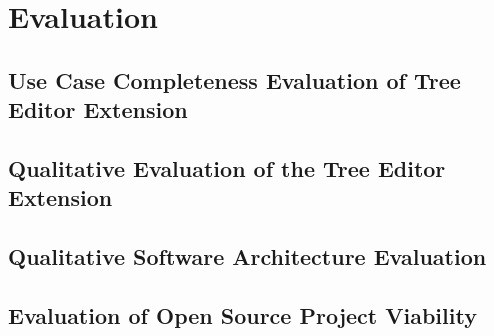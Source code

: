 \chapter{Evaluation}\label{chap:evaluation}

\section{Use Case Completeness Evaluation of Tree Editor Extension}




\section{Qualitative Evaluation of the Tree Editor Extension}




\section{Qualitative Software Architecture Evaluation}




\section{Evaluation of Open Source Project Viability}


